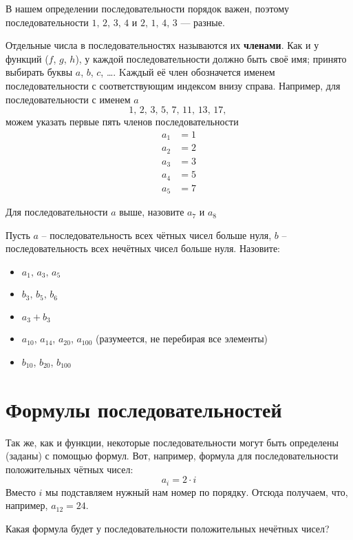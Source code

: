 \documentclass[11pt,fleqn]{book} %
\begin{document}
В нашем определении последовательности порядок важен, поэтому последовательности $1,\,2,\,3,\,4$ и $2,\,1,\,4,\,3$ --- разные.

Отдельные числа в последовательностях называются их \textbf{членами}. Как и у функций ($f$, $g$, $h$), у каждой последовательности должно быть своё имя; принято выбирать буквы $a$, $b$, $c$, \ldots. Kаждый её член обозначется именем последовательности с соответствующим индексом внизу справа. Например, для последовательности с именем $a$ $$1,\,2,\,3,\,5,\,7,\,11,\,13,\,17,\,$$ можем указать первые пять членов последовательности 
\begin{align*}
a_1 &= 1 \\
a_2 &= 2 \\
a_3 &= 3 \\
a_4 &= 5 \\
a_5 &= 7 
\end{align*}

\begin{exercise}
Для последовательности $a$ выше, назовите $a_7$ и $a_8$
\end{exercise}

\begin{exercise}
Пусть $a$ -- последовательность всех чётных чисел больше нуля, $b$ -- последовательность всех нечётных чисел больше нуля. Назовите:
\begin{itemize}
\item $a_1,\,a_3,\,a_5$
\item $b_3,\, b_5,\, b_6$
\item $a_3 + b_3$
\item $a_{10}$, $a_{14}$, $a_{20}$, $a_{100}$ (разумеется, не перебирая все элементы)
\item $b_{10}$, $b_{20}$, $b_{100}$
\end{itemize} 
\end{exercise}

\chapter{Формулы последовательностей}

Так же, как и функции, некоторые последовательности могут быть определены (заданы) с помощью формул. 
Вот, например, формула для последовательности положительных чётных чисел: $$  a_i = 2\cdot i$$ Вместо $i$ мы подставляем нужный нам номер по порядку. Отсюда получаем, что, например, $a_{12} = 24$.

\begin{exercise}
Какая формула будет у последовательности положительных нечётных чисел?
\end{exercise}
\end{document}
